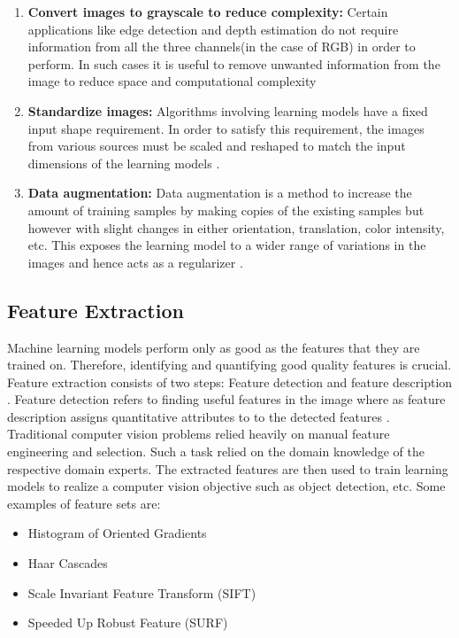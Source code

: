 \begin{enumerate}
	\item \textbf{Convert images to grayscale to reduce complexity:} Certain applications like edge detection and depth estimation do not require information from all the three channels(in the case of RGB) in order to perform. In such cases it is useful to remove unwanted information from the image to reduce space and computational complexity \cite{WEB:manning}
	
	\item \textbf{Standardize images:} Algorithms involving learning models have a fixed input shape requirement. In order to satisfy this requirement, the images from various sources must be scaled and reshaped to match the input dimensions of the learning models \cite{WEB:manning} .
	
	\item \textbf{Data augmentation:} Data augmentation is a method to increase the amount of training samples by making copies of the existing samples but however with slight changes in either orientation, translation, color intensity, etc. This exposes the learning model to a wider range of variations in the images and hence acts as a regularizer \cite{WEB:manning}.
	
\end{enumerate}


\subsection{Feature Extraction}
Machine learning models perform only as good as the features that they are trained on. Therefore, identifying and quantifying good quality features is crucial. Feature extraction consists of two steps: Feature detection and feature description \cite{gonzalez2002digital}. Feature detection refers to finding useful features in the image where as feature description assigns quantitative attributes to to the detected features \cite{gonzalez2002digital}.
Traditional computer vision problems relied heavily on manual feature engineering and selection. Such a task relied on the domain knowledge of the respective domain experts. The extracted features are then used to train learning models to realize a computer vision objective such as object detection, etc. 
Some examples of feature sets are:
\begin{itemize}
	\item Histogram of Oriented Gradients
	\item Haar Cascades
	\item Scale Invariant Feature Transform (SIFT)
	\item Speeded Up Robust Feature (SURF)
\end{itemize}

